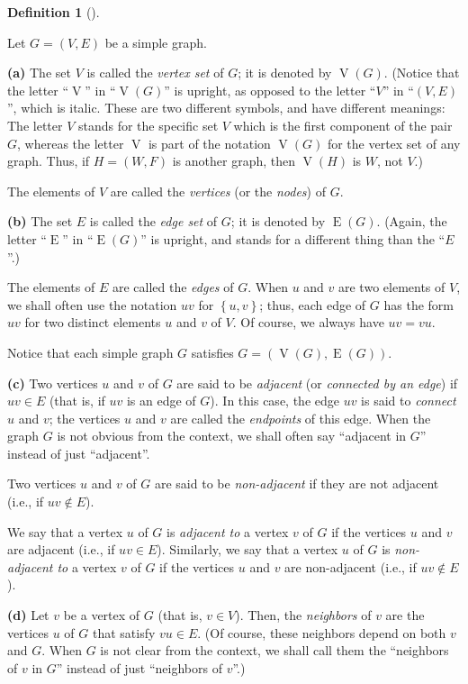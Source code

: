 \documentclass[numbers=enddot,12pt,final,onecolumn,notitlepage]{scrartcl}%
\theoremstyle{definition}
\newtheorem{defi}[theo]{Definition}
\newenvironment{definition}[1][]
{\begin{defi}[#1]\begin{leftbar}}
{\end{leftbar}\end{defi}}
\newcommand{\set}[1]{\left\{ #1 \right\}}
\newcommand{\tup}[1]{\left( #1 \right)}
\newcommand{\verts}[1]{\operatorname{V}\left( #1 \right)}
\newcommand{\edges}[1]{\operatorname{E}\left( #1 \right)}
\begin{document}
\begin{definition} \label{def.intro.simple.VE}
Let $G = \tup{V, E}$ be a simple graph.

\textbf{(a)} The set $V$ is called the \textit{vertex set} of $G$;
it is denoted by $\verts{G}$. (Notice that the letter
``$\operatorname{V}$'' in ``$\verts{G}$'' is upright, as opposed to
the letter ``$V$'' in ``$\tup{V, E}$'', which is italic.
These are two different symbols, and have different meanings: The
letter $V$ stands for the specific set $V$ which is the first
component of the pair $G$, whereas the letter
$\operatorname{V}$ is part of the notation $\verts{G}$ for the
vertex set of any graph. Thus, if $H = \left(W, F\right)$ is another
graph, then $\verts{H}$ is $W$, not $V$.)

The elements of $V$ are called the \textit{vertices} (or the
\textit{nodes}) of $G$.

\textbf{(b)} The set $E$ is called the \textit{edge set} of $G$; it
is denoted by $\edges{G}$. (Again, the letter ``$\operatorname{E}$''
in ``$\edges{G}$'' is upright, and stands for a different thing than
the ``$E$''.)

The elements of $E$ are called the \textit{edges} of $G$. When $u$ and
$v$ are two elements of $V$, we shall often use the notation $uv$ for
$\set{u, v}$; thus, each edge of $G$ has the form $uv$ for two
distinct elements $u$ and $v$ of $V$. Of course, we always have
$uv = vu$.

Notice that each simple graph $G$ satisfies
$G = \tup{\verts{G}, \edges{G}}$.

\textbf{(c)} Two vertices $u$ and $v$ of $G$ are said to be
\textit{adjacent} (or \textit{connected by an edge}) if $uv \in E$
(that is, if $uv$ is an edge of $G$). In this case, the edge $uv$ is
said to \textit{connect} $u$ and $v$; the vertices $u$ and $v$ are
called the \textit{endpoints} of this edge. When the graph $G$ is not
obvious from the context, we shall often say ``adjacent in $G$''
instead of just ``adjacent''.

Two vertices $u$ and $v$ of $G$
are said to be \textit{non-adjacent} if they are not adjacent (i.e.,
if $uv \notin E$).

We say that a vertex $u$ of $G$ is \textit{adjacent to} a vertex $v$
of $G$ if the vertices $u$ and $v$ are adjacent (i.e., if $uv \in E$).
Similarly, we say that a vertex $u$ of $G$ is \textit{non-adjacent to}
a vertex $v$ of $G$ if the vertices $u$ and $v$ are non-adjacent
(i.e., if $uv \notin E$).

\textbf{(d)} Let $v$ be a vertex of $G$ (that is, $v \in V$). Then,
the \textit{neighbors} of $v$ are the vertices $u$ of $G$ that
satisfy $vu \in E$. (Of course, these neighbors depend on both $v$ and
$G$. When $G$ is not clear from the context, we shall call them the
``neighbors of $v$ in $G$'' instead of just ``neighbors of $v$''.)
\end{definition}
\end{document}
